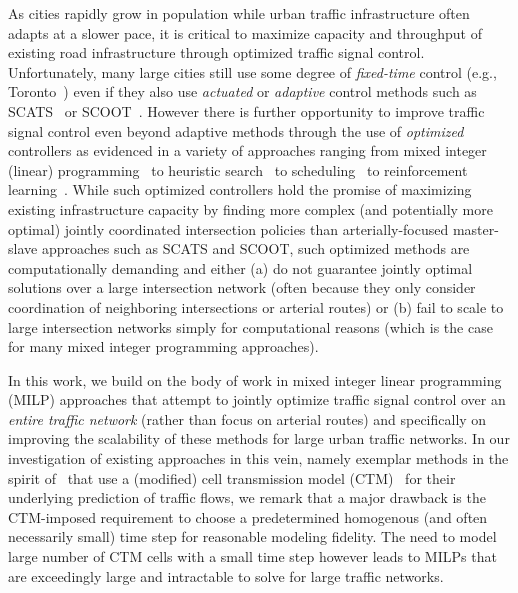 As cities rapidly grow in population while urban traffic
infrastructure often adapts at a slower pace, it is critical to
maximize capacity and throughput of existing road infrastructure
through optimized traffic signal control.  Unfortunately, many large
cities still use some degree of \emph{fixed-time} control (e.g.,
Toronto~) even if they also use
\emph{actuated} or \emph{adaptive} control methods such as SCATS~
or SCOOT~.  However there is
further opportunity to improve traffic signal control even beyond
adaptive methods through the use of \emph{optimized} controllers as
evidenced in a variety of approaches ranging from mixed integer
(linear)
programming~
to heuristic search~ to
scheduling~ to reinforcement
learning~.  While such optimized controllers
hold the promise of maximizing existing infrastructure capacity by
finding more complex (and potentially more optimal) jointly
coordinated intersection policies than arterially-focused master-slave
approaches such as SCATS and SCOOT, such optimized methods are
computationally demanding
and either (a) do not guarantee jointly optimal solutions over a large
intersection network (often because they only consider coordination of
neighboring intersections or arterial routes) or (b) fail to scale to
large intersection networks simply for computational reasons (which is
the case for many mixed integer programming approaches).

In this work, we build on the body of work in mixed integer linear
programming (MILP) approaches that attempt to jointly optimize traffic
signal control over an \emph{entire traffic network} (rather than
focus on arterial routes) and specifically on improving the
scalability of these methods for large urban traffic networks.  In our
investigation of existing approaches in this vein, namely exemplar
methods in the spirit of~ that
use a (modified) cell transmission model
(CTM)~ for their underlying
prediction of traffic flows, we remark that a major drawback is the
CTM-imposed requirement to choose a predetermined homogenous (and
often necessarily small) time step for reasonable modeling fidelity.
The need to model large number of CTM cells with a small time step
however leads to MILPs that are exceedingly large and intractable to
solve for large traffic networks.

